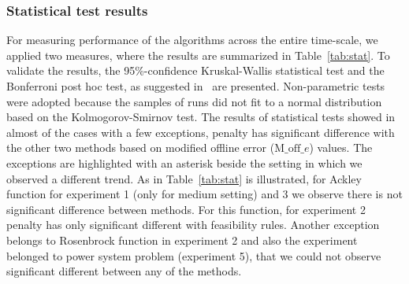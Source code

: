 \documentclass[review]{elsarticle}
\begin{document}
\subsubsection{Statistical test results}
For measuring performance of the algorithms across the entire time-scale, we applied two measures, where the results are summarized in Table~\ref{tab:stat}. To validate the results, the 95\%-confidence Kruskal-Wallis statistical test and the Bonferroni post hoc test, as suggested in~\citep{Derrac20113} are presented. Non-parametric tests were adopted because the samples of runs did not fit to a normal distribution based on the Kolmogorov-Smirnov test.
The results of statistical tests showed in almost of the cases with a few exceptions, penalty has significant difference with the other two methods based on modified offline error ($\text{M\_off}\_e$) values. The exceptions are highlighted with an asterisk beside the setting in which we observed a different trend. As in Table~\ref{tab:stat} is illustrated, for Ackley function for experiment 1 (only for medium setting) and 3 we observe there is not significant difference between methods. For this function, for experiment 2 penalty has only significant different with feasibility rules. Another exception belongs to Rosenbrock function in experiment 2 and also the experiment belonged to power system problem (experiment 5), that we could not observe significant different between any of the methods.
\end{document}
